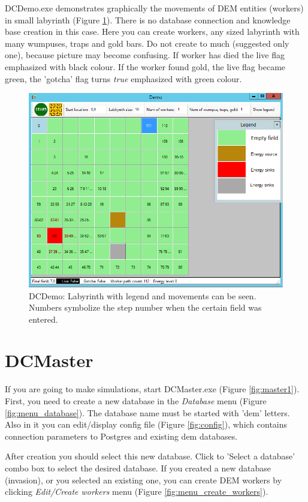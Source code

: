\documentclass[a4paper,12pt]{article}
\begin{document}
DCDemo.exe  demonstrates graphically the movements of DEM entities (workers) in small labyrinth (Figure \ref{fig:demo}). There is no database connection and knowledge base creation in this case. Here you can create workers, any sized labyrinth with many wumpuses, traps and gold bars. Do not create to much (suggested only one), because picture may become confusing.
If worker has died the live flag emphasized with black colour. If the worker found gold, the live flag became green, the 'gotcha' flag turns \textit{true} emphasized with green colour.

\begin{figure}
\centering
	\includegraphics[width=14cm]{demo.png}
	\caption{DCDemo: Labyrinth with legend and movements can be seen. Numbers symbolize the step number when the certain field was entered.}
	\label{fig:demo}
\end{figure}




\section{DCMaster}

If you are going to make simulations, start DCMaster.exe (Figure \ref{fig:master1}). First, you need to create a new database in the \textit{Database} menu (Figure \ref{fig:menu_database}). The database name must be started with 'dem' letters. Also in it you can edit/display config file (Figure \ref{fig:config}), which contains connection parameters to Postgres and existing dem databases. 

After creation you should select this new database. Click to 'Select a database' combo box to select the desired database.
If you created a new database (invasion), or you selected an existing one,  you can create DEM workers by clicking \textit{Edit/Create workers} menu (Figure \ref{fig:menu_create_workers}).
\end{document}
